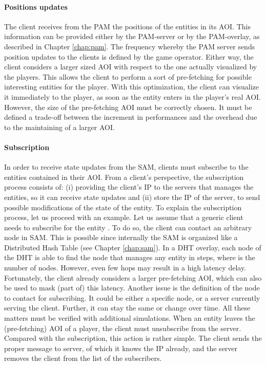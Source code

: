 \documentclass[final,10pt,a5paper]{phdimt}
\theoremstyle{definition}
\begin{document}
\paragraph{Positions updates}
The client receives from the PAM the positions of the entities in its AOI.
This information can be provided either by the PAM-server or by the PAM-overlay, as described in Chapter \ref{chap:pam}.
The frequency whereby the PAM server sends position updates to the clients is defined by the game operator.
Either way, the client considers a larger sized AOI with respect to the one actually visualized by the players.
This allows the client to perform a sort of pre-fetching for possible interesting entities for the player.
With this optimization, the client can visualize it immediately to the player, as soon as the entity enters in the player's real AOI.
However, the size of the pre-fetching AOI must be correctly chosen.
It must be defined a trade-off between the increment in performances and the overhead due to the maintaining of a larger AOI.


\paragraph{Subscription}
In order to receive state updates from the SAM, clients must subscribe to the entities contained in their AOI.
From a client's perspective, the subscription process consists of: (i) providing the client's IP to the servers that manages the entities, so it can receive state updates and (ii) store the IP of the server, to send possible modifications of the state of the entity.
To explain the subscription process, let us proceed with an example.
Let us assume that a generic client needs to subscribe for the entity .
To do so, the client can contact an arbitrary node in SAM.
This is possible since internally the SAM is organized like a Distributed Hash Table (see Chapter \ref{chap:sam}). 
In a DHT overlay, each node of the DHT is able to find the node that manages any entity in  steps, where  is the number of nodes. However, even few hops may result in a high latency delay.
Fortunately, the client already considers a larger pre-fetching AOI, which can also be used to mask (part of) this latency.
Another issue is the definition of the node to contact for subscribing.
It could be either a specific node, or a server currently serving the client.
Further, it can stay the same or change over time. All these matters must be verified with additional simulations.
When an entity leaves the (pre-fetching) AOI of a player, the client must unsubscribe from the server.
Compared with the subscription, this action is rather simple. The client sends the proper message to server, of which it knows the IP already, and the server removes the client from the list of the subscribers.
\end{document}
